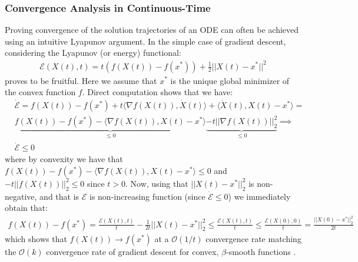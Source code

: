 \documentclass{article}
\begin{document}
\subsubsection{Convergence Analysis in Continuous-Time}
Proving convergence of the solution trajectories of an ODE can often be achieved using an intuitive Lyapunov argument. In the simple case of gradient descent, considering the Lyapunov (or energy) functional:
\begin{align*}
    \mathcal{E}(X(t), t) = t (f(X(t)) - f(x^*)) + \frac{1}{2}||X(t)-x^*||^2
\end{align*}
proves to be fruitful. Here we assume that $x^*$ is the unique global minimizer of the convex function $f$. Direct computation shows that we have:
\begin{align*}
    & \dot{\mathcal{E}}= f(X(t)) - f(x^*) + t \langle \nabla f(X(t)), \dot{X}(t) \rangle + \langle \dot{X}(t), X(t)-x^* \rangle = \\
    & \underbrace{f(X(t)) - f(x^*) - \langle \nabla f(X(t)), X(t) - x^* \rangle}_{\leq 0} \underbrace{- t || \nabla f(X(t))||_2^2}_{\leq 0} \implies \\
    & \dot{\mathcal{E}} \leq 0
\end{align*}
where by convexity we have that $f(X(t)) - f(x^*) - \langle \nabla f(X(t)), X(t) - x^* \rangle \leq 0$ and $ - t ||f(X(t))||_2^2 \leq 0$ since $t>0$. Now, using that $||X(t)-x^*||_2^2$ is non-negative, and that is $\mathcal{E}$ is non-increasing function (since $\dot{\mathcal{E}} \leq 0$) we immediately obtain that:
\begin{align*}
    f(X(t)) - f(x^*) = \frac{\mathcal{E}(X(t), t)}{t} - \frac{1}{2t} ||X(t) - x^*||_2^2 \leq \frac{\mathcal{E}(X(t), t)}{t} \leq \frac{\mathcal{E}(X(0), 0)}{t} = \frac{||X(0)-x^*||_2^2}{2t}
\end{align*}
which shows that $f(X(t)) \to f(x^*)$ at a $\mathcal{O}(1/t)$ convergence rate matching the $\mathcal{O}(k)$ convergence rate of gradient descent for convex, $\beta$-smooth functions \cite{DBLP:journals/ftml/Bubeck15}.
\end{document}
